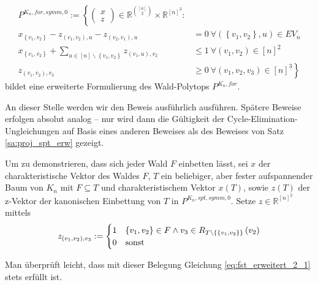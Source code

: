 \documentclass[10p,a4paper,BCOR = 12mm, DIV=15]{scrbook}
\begin{document}
{\begin{Sa}
\label{sa:baum_erweitert_1}
\begin{align}
P^{K_n, for, symm, 0} := \left\{\left(\begin{array}{c}
x \\
z
\end{array}\right)\in\mathbb{R}^{[n]\choose 2}\times \mathbb{R}^{[n]^{\underline{3}}}: \right. \nonumber \\
x_{\left\{v_1, v_2\right\}} - z_{\left(v_1, v_2\right), u} - z_{\left(v_2, v_1\right), u} & = 0\ \forall \left(\left\{v_1, v_2\right\}, u\right)\in EV_n \label{eq:fst_erweitert_2_1} \\
x_{\left\{v_1, v_2\right\}} + \sum_{u\in[n]\backslash\left\{v_1, v_2\right\}} z_{\left(v_1, u\right), v_2} & \leq 1\ \forall \left(v_1, v_2\right)\in [n]^{\underline{2}} \label{eq:fst_erweitert_2_2} \\
z_{\left(v_1, v_2\right), v_3} & \geq 0 \nonumber \left. \ \forall \left(v_1, v_2, v_3\right) \in \left[n\right]^{\underline{3}}\right\}
\end{align}
bildet eine erweiterte Formulierung des Wald-Polytops $P^{K_n, for}$.
\end{Sa}

\begin{bew}
An dieser Stelle werden wir den Beweis ausführlich ausführen. Spätere Beweise erfolgen absolut analog -- nur wird dann die Gültigkeit der Cycle-Elimination-Ungleichungen auf Basis eines anderen Beweises als des Beweises von Satz \ref{sa:proj_spt_erw} gezeigt.

Um zu demonstrieren, dass sich jeder Wald $F$ einbetten lässt, sei $x$ der charakteristische Vektor des Waldes $F$, $T$ ein beliebiger, aber fester aufspannender Baum von $K_n$ mit $F \subseteq T$ und charakteristischem Vektor $x\left(T\right)$, sowie $z\left(T\right)$ der z-Vektor der kanonischen Einbettung von $T$ in $P^{K_n, spt, symm, 0}$. Setze $z\in \mathbb{R}^{[n]^{\underline{3}}}$ mittels
\begin{displaymath}
z_{\left(v_1, v_2\right), v_3} := \begin{cases}
1 & \left\{v_1, v_2\right\}\in F\wedge v_3 \in R_{T\backslash \left\{\left\{v_1, v_2\right\}\right\}}\left(v_2\right) \\
0 & \textnormal{sonst}
\end{cases}
\end{displaymath}

Man überprüft leicht, dass mit dieser Belegung Gleichung \eqref{eq:fst_erweitert_2_1} stets erfüllt ist.


\end{bew}}
\end{document}
